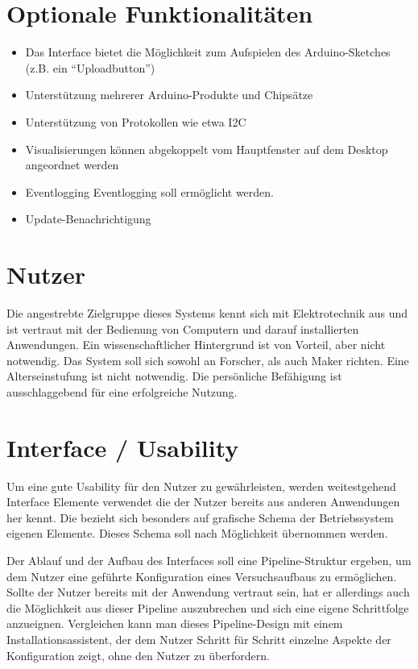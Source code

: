 \section{Optionale Funktionalitäten}
\begin{itemize}
 \item Das Interface bietet die Möglichkeit zum Aufspielen des Arduino-Sketches (z.B. ein ``Uploadbutton'')
 \item Unterstützung mehrerer Arduino-Produkte und Chipsätze
 \item Unterstützung von Protokollen wie etwa I2C
 \item Visualisierungen können abgekoppelt vom Hauptfenster auf dem Desktop angeordnet werden
 \item Eventlogging \gls{Eventlogging} soll ermöglicht werden.
 \item Update-Benachrichtigung
\end{itemize}

\section{Nutzer}
Die angestrebte Zielgruppe dieses Systems kennt sich mit Elektrotechnik aus und ist vertraut mit der Bedienung von Computern und darauf installierten Anwendungen. Ein wissenschaftlicher Hintergrund ist von Vorteil, aber nicht notwendig. Das System soll sich sowohl an Forscher, als auch \gls{Maker} richten.
Eine Alterseinstufung ist nicht notwendig. Die persönliche Befähigung ist ausschlaggebend für eine erfolgreiche Nutzung.

\section{Interface / Usability}
Um eine gute Usability für den Nutzer zu gewährleisten, werden weitestgehend Interface Elemente verwendet die der Nutzer bereits aus anderen Anwendungen her kennt.
Die bezieht sich besonders auf grafische Schema der Betriebssystem eigenen Elemente. Dieses Schema soll nach Möglichkeit übernommen werden.

Der Ablauf und der Aufbau des Interfaces soll eine Pipeline-Struktur ergeben, um dem Nutzer eine geführte Konfiguration eines Versuchsaufbaus zu ermöglichen. Sollte der Nutzer bereits mit der Anwendung vertraut sein, hat er allerdings auch die Möglichkeit aus dieser Pipeline auszubrechen und sich eine eigene Schrittfolge anzueignen. Vergleichen kann man dieses Pipeline-Design mit einem Installationsassistent, der dem Nutzer Schritt für Schritt einzelne Aspekte der Konfiguration zeigt, ohne den Nutzer zu überfordern.

